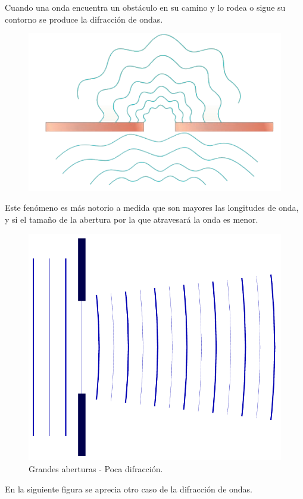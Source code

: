 \documentclass[12pt, letter]{article}
\begin{document}
Cuando una onda encuentra un obstáculo en su camino y lo rodea o sigue su contorno  se produce la difracción de ondas.
\begin{figure}[H]
    \centering
    \includegraphics[scale=0.6]{Imagenes/Difraccion_01.PNG}
\end{figure}
Este fenómeno es más notorio a medida que son mayores las longitudes de onda, y si el tamaño de la abertura por la que atravesará la onda es menor.
\begin{figure}[H]
    \centering
    \includegraphics[scale=0.25]{Imagenes/Difraccion_Patrones_01.png}
    \caption{Grandes aberturas - Poca difracción.}
\end{figure}
En la siguiente figura se aprecia otro caso de la difracción de ondas.
\end{document}
